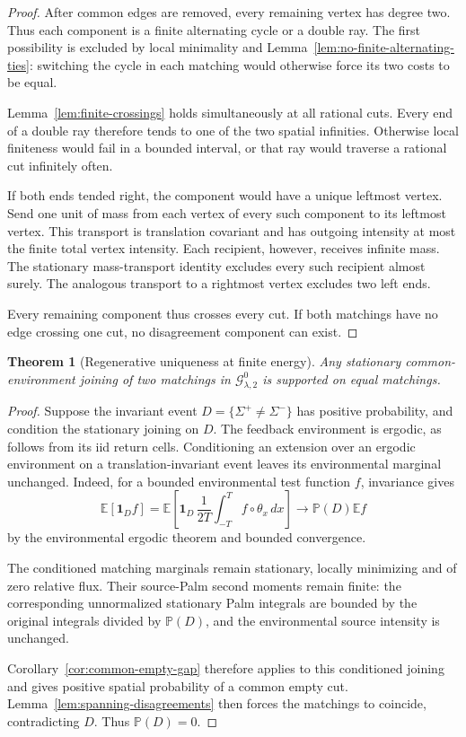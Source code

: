 \documentclass[11pt,reqno]{amsart}
\newtheorem{theorem}{Theorem}[section]
\theoremstyle{definition}
\theoremstyle{remark}
\numberwithin{equation}{section}
\newcommand{\E}{\mathbb E}
\newcommand{\Pp}{\mathbb P}
\begin{document}
\begin{proof}
After common edges are removed, every remaining vertex has degree two.
Thus each component is a finite alternating cycle or a double ray.
The first possibility is excluded by local minimality and
Lemma~\ref{lem:no-finite-alternating-ties}: switching the cycle in
each matching would otherwise force its two costs to be equal.

Lemma~\ref{lem:finite-crossings} holds simultaneously at all rational
cuts.  Every end of a double ray therefore tends to one of the two
spatial infinities.  Otherwise local finiteness would fail in a bounded
interval, or that ray would traverse a rational cut infinitely often.

If both ends tended right, the component would have a unique leftmost
vertex.  Send one unit of mass from each vertex of every such component
to its leftmost vertex.  This transport is translation covariant and
has outgoing intensity at most the finite total vertex intensity.
Each recipient, however, receives infinite mass.  The stationary
mass-transport identity excludes every such recipient almost surely.
The analogous transport to a rightmost vertex excludes two left ends.

Every remaining component thus crosses every cut.  If both matchings
have no edge crossing one cut, no disagreement component can exist.
\end{proof}

\begin{theorem}[Regenerative uniqueness at finite energy]
\label{thm:regenerative-matching-uniqueness}
Any stationary common-environment joining of two matchings in
\(\mathcal G_{\lambda,2}^0\) is supported on equal matchings.
\end{theorem}

\begin{proof}
Suppose the invariant event
\(D=\{\Sigma^+\ne\Sigma^-\}\) has positive probability, and
condition the stationary joining on \(D\).  The feedback environment
is ergodic, as follows from its iid return cells.  Conditioning an
extension over an ergodic environment on a translation-invariant event
leaves its environmental marginal unchanged.  Indeed, for a bounded
environmental test function \(f\), invariance gives
\[
\E[\mathbf1_D f]
=\E\left[\mathbf1_D\,
\frac1{2T}\int_{-T}^T f\circ\theta_x\,dx\right]
\longrightarrow \Pp(D)\E f
\]
by the environmental ergodic theorem and bounded convergence.

The conditioned matching marginals remain stationary, locally
minimizing and of zero relative flux.  Their source-Palm second moments
remain finite: the corresponding unnormalized stationary Palm
integrals are bounded by the original integrals divided by \(\Pp(D)\),
and the environmental source intensity is unchanged.

Corollary~\ref{cor:common-empty-gap} therefore applies to this
conditioned joining and gives positive spatial probability of a
common empty cut.  Lemma~\ref{lem:spanning-disagreements} then forces
the matchings to coincide, contradicting \(D\).  Thus \(\Pp(D)=0\).
\end{proof}
\end{document}
